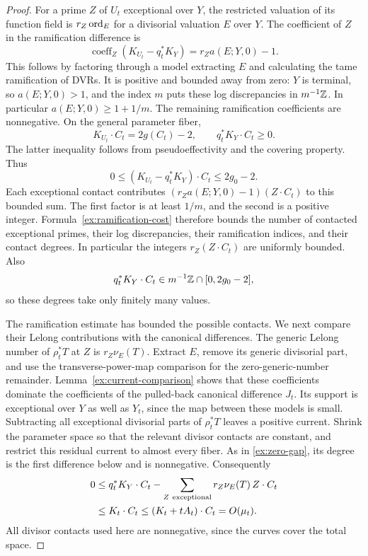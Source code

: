 \begin{proof}
For a prime \(Z\) of \(U_t\) exceptional over \(Y\), the
restricted valuation of its function field is
\(r_Z\operatorname{ord}_E\) for a divisorial valuation \(E\) over \(Y\).
The coefficient of \(Z\) in the ramification difference is
\begin{equation}\label{ex:ramification-cost}
 \operatorname{coeff}_Z(K_{U_t}-q_t^*K_Y)
       =r_Za(E;Y,0)-1.
\end{equation}
This follows by factoring through a model extracting \(E\)
and calculating the tame ramification of DVRs. It is
positive and bounded away from zero: \(Y\) is terminal,
so \(a(E;Y,0)>1\), and the index \(m\) puts these log
discrepancies in \(m^{-1}\mathbb{Z}\). In particular
\(a(E;Y,0)\geq1+1/m\). The
remaining ramification coefficients are nonnegative.
On the general parameter fiber,
\[
 K_{U_t}\cdot C_t=2g(C_t)-2,\qquad
 q_t^*K_Y\cdot C_t\geq0.
 \]
The latter inequality follows from pseudoeffectivity and
the covering property. Thus
\[
 0\leq (K_{U_t}-q_t^*K_Y)\cdot C_t\leq 2g_0-2.
\]
Each exceptional contact contributes
\((r_Za(E;Y,0)-1)(Z\cdot C_t)\) to this bounded sum.
The first factor is at least \(1/m\), and the second is
a positive integer. Formula~\eqref{ex:ramification-cost}
therefore bounds the number of contacted exceptional primes,
their log discrepancies, their ramification indices, and
their contact degrees. In particular the integers
\(r_Z(Z\cdot C_t)\) are uniformly bounded. Also
\[
 q_t^*K_Y\cdot C_t\in m^{-1}\mathbb{Z}\cap[0,2g_0-2],
\]
so these degrees take only finitely many values.

The ramification estimate has bounded the possible contacts. We next
compare their Lelong contributions with the canonical differences.
The generic Lelong number of \(\rho_t^*T\) at \(Z\) is
\(r_Z\nu_E(T)\). Extract \(E\), remove its generic
divisorial part, and use the transverse-power-map
comparison for the zero-generic-number remainder.
Lemma~\ref{ex:current-comparison} shows that these
coefficients dominate the coefficients of the pulled-back
canonical difference \(J_t\). Its support is exceptional
over \(Y\) as well as \(Y_t\), since the map between these
models is small. Subtracting all exceptional divisorial
parts of \(\rho_t^*T\) leaves a positive current. Shrink the
parameter space so that the relevant divisor contacts are
constant, and restrict this residual current to almost every
fiber. As in \eqref{ex:zero-gap}, its degree is the first
difference below and is nonnegative. Consequently
\begin{equation}\label{ex:bounded-gap}
 \begin{split}
 0&\leq q_t^*K_Y\cdot C_t
       -\sum_{Z\ {\rm exceptional}}
                r_Z\nu_E(T)\,Z\cdot C_t\\
  &\leq K_t\cdot C_t
   \leq (K_t+tA_t)\cdot C_t
   =O(\mu_t).
 \end{split}
\end{equation}
All divisor contacts used here are nonnegative, since the
curves cover the total space.


\end{proof}
